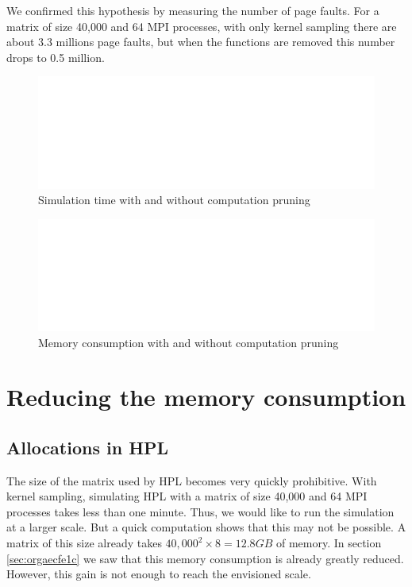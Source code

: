 \documentclass[12pt, a4paper]{memoir}
\begin{document}
We confirmed this hypothesis by measuring the number of page faults. For a matrix of size 40,000 and 64 MPI
processes, with only kernel sampling there are about 3.3 millions page faults, but when the functions are removed
this number drops to 0.5 million.

\begin{figure}[htpb]
\centering
\includegraphics[width=\linewidth,page=2]{../validation/L2/report_plot_time.pdf}
\caption{Simulation time with and without computation pruning}
\label{fig:pruning_time}
\end{figure}

\begin{figure}[htpb]
\centering
\includegraphics[width=\linewidth,page=2]{../validation/L2/report_plot_memory.pdf}
\caption{Memory consumption with and without computation pruning}
\label{fig:pruning_mem_consumption}
\end{figure}

\section{Reducing the memory consumption}
\label{sec:org4d84920}
\subsection{Allocations in HPL}
\label{sec:org34fa017}
The size of the matrix used by HPL becomes very quickly prohibitive. With kernel sampling, simulating HPL with a
matrix of size 40,000 and 64 MPI processes takes less than one minute. Thus, we would like to run the simulation
at a larger scale. But a quick computation shows that this may not be possible. A matrix of this size already takes
\(40,000^2 \times 8 = 12.8 GB\) of memory. In section \ref{sec:orgaecfe1c} we saw that this memory consumption is already
greatly reduced. However, this gain is not enough to reach the envisioned scale.
\end{document}
